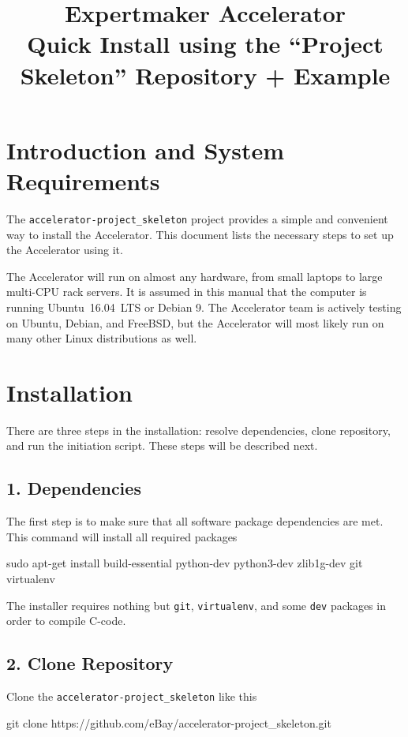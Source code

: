 \documentclass[a4paper]{article}
\title{\vspace{-20mm}Expertmaker Accelerator\\[1ex]\Large{Quick Install using the ``Project Skeleton'' Repository + Example}}
\date{}
\begin{document}
\maketitle

\section*{Introduction and System Requirements}
The \texttt{accelerator-project\_skeleton} project provides a simple
and convenient way to install the Accelerator.  This document lists
the necessary steps to set up the Accelerator using it.

The Accelerator will run on almost any hardware, from small laptops to
large multi-CPU rack servers.  It is assumed in this manual that the
computer is running Ubuntu~16.04~LTS or Debian 9.  The Accelerator
team is actively testing on Ubuntu, Debian, and FreeBSD, but the
Accelerator will most likely run on many other Linux distributions as well.


\section*{Installation}
There are three steps in the installation: resolve dependencies, clone
repository, and run the initiation script.  These steps will be
described next.
\subsection*{1. Dependencies}
The first step is to make sure that all software package dependencies
are met.  This command will install all required packages
\begin{shell}
sudo apt-get install build-essential python-dev python3-dev zlib1g-dev git virtualenv
\end{shell}
The installer requires nothing but \texttt{git}, \texttt{virtualenv},
and some \texttt{dev} packages in order to compile C-code.

\subsection*{2. Clone Repository}
Clone the \texttt{accelerator-project\_skeleton} like this
\begin{shell}
git clone https://github.com/eBay/accelerator-project_skeleton.git
\end{shell}
\end{document}
